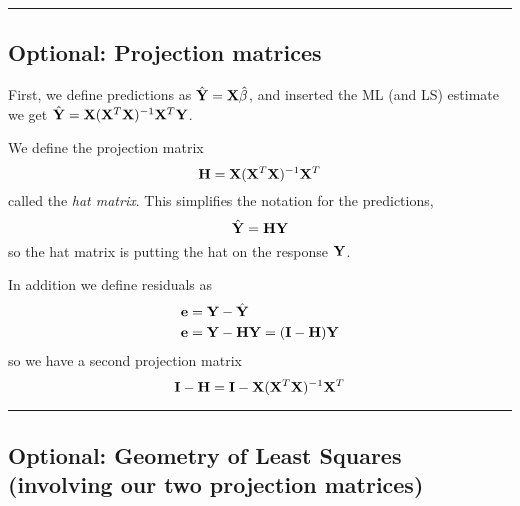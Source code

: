 \documentclass[]{article}
\begin{document}
\begin{center}\rule{0.5\linewidth}{\linethickness}\end{center}

\hypertarget{optional-projection-matrices}{%
\subsection{Optional: Projection
matrices}\label{optional-projection-matrices}}

First, we define predictions as \(\hat{\bf Y}={\bf X}\hat{\beta}\), and
inserted the ML (and LS) estimate we get
\(\hat{\bf Y}={\bf X}({\bf X}^T{\bf X})^{-1}{\bf X}^T{\bf Y}\).

We define the projection matrix
\[  {\bf H}={\bf X}({\bf X}^T{\bf X})^{-1} {\bf X}^T\] called the
\emph{hat matrix}. This simplifies the notation for the predictions,
\[\hat{\bf Y}={\bf H}{\bf Y}\] so the hat matrix is putting the hat on
the response \({\bf Y}\).

In addition we define residuals as \begin{align*}
{\bf e}&={\bf Y}-\hat{\bf Y} \\
{\bf e}&={\bf Y}-{\bf HY}=({\bf I-H}){\bf Y}\\
\end{align*} so we have a second projection matrix
\[ {\bf I-H}={\bf I}-{\bf X}({\bf X}^T{\bf X})^{-1} {\bf X}^T \]

\begin{center}\rule{0.5\linewidth}{\linethickness}\end{center}

\hypertarget{optional-geometry-of-least-squares-involving-our-two-projection-matrices}{%
\subsection{Optional: Geometry of Least Squares (involving our two
projection
matrices)}\label{optional-geometry-of-least-squares-involving-our-two-projection-matrices}}
\end{document}
